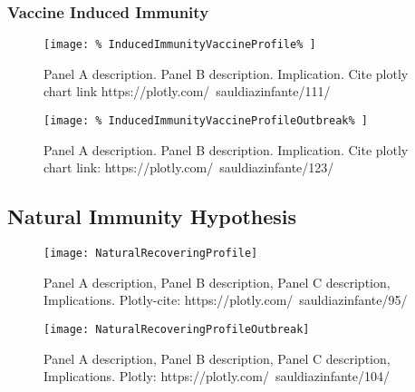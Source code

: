     \subsubsection*{Vaccine Induced Immunity}
%
    \begin{figure*}[htb]
        \centering
        \texttt{[image: \%
        InducedImmunityVaccineProfile\%
        ]}
        \caption[
            Induced vaccine immunity
            effect.
        ]{
            Panel A description.
            Panel B description.
            Implication.
            Cite plotly chart link
            https://plotly.com/~sauldiazinfante/111/
        }
        \label{fig:inducedimmunityvaccineprofile}
    \end{figure*}
    \begin{figure*}[htb]
    \centering
    \texttt{[image: \%
        InducedImmunityVaccineProfileOutbreak\%
    ]}
    \caption[
    Induced vaccine immunity
    effect.
    ]{
        Panel A description.
        Panel B description.
        Implication.
        Cite plotly chart link:
        https://plotly.com/~sauldiazinfante/123/
    }
    \label{fig:inducedimmunityvaccineprofile}
\end{figure*}

    \subsection{Natural Immunity Hypothesis}
        \begin{figure*}[tbh!]
            \centering
            \texttt{[image: NaturalRecoveringProfile]}
            \caption[Vaccine induced immunity profile.]{
                Panel A description,
                Panel B description,
                Panel C description,
                Implications.
                Plotly-cite: https://plotly.com/~sauldiazinfante/95/}
            \label{fig:naturalrecoveringprofile}
        \end{figure*}

        \begin{figure*}[tbh!]
            \centering
            \texttt{[image: NaturalRecoveringProfileOutbreak]}
            \caption[Vaccine induced immunity profile.]{Panel A description, Panel B
                description, Panel C description, Implications.
                Plotly: https://plotly.com/~sauldiazinfante/104/}
            \label{fig:naturalrecoveringprofile}
        \end{figure*}
